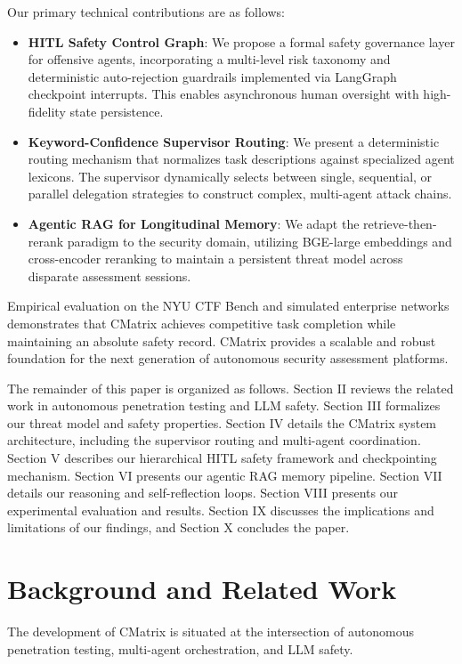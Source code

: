 \documentclass[conference,compsoc]{IEEEtran}
\begin{document}
Our primary technical contributions are as follows:
\begin{itemize}
    \item \textbf{HITL Safety Control Graph}: We propose a formal safety governance layer for offensive agents, incorporating a multi-level risk taxonomy and deterministic auto-rejection guardrails implemented via LangGraph checkpoint interrupts. This enables asynchronous human oversight with high-fidelity state persistence.
    
    \item \textbf{Keyword-Confidence Supervisor Routing}: We present a deterministic routing mechanism that normalizes task descriptions against specialized agent lexicons. The supervisor dynamically selects between single, sequential, or parallel delegation strategies to construct complex, multi-agent attack chains.

    \item \textbf{Agentic RAG for Longitudinal Memory}: We adapt the retrieve-then-rerank paradigm to the security domain, utilizing BGE-large embeddings and cross-encoder reranking to maintain a persistent threat model across disparate assessment sessions.
\end{itemize}

Empirical evaluation on the NYU CTF Bench and simulated enterprise networks demonstrates that CMatrix achieves competitive task completion while maintaining an absolute safety record. CMatrix provides a scalable and robust foundation for the next generation of autonomous security assessment platforms.

The remainder of this paper is organized as follows. Section II reviews the related work in autonomous penetration testing and LLM safety. Section III formalizes our threat model and safety properties. Section IV details the CMatrix system architecture, including the supervisor routing and multi-agent coordination. Section V describes our hierarchical HITL safety framework and checkpointing mechanism. Section VI presents our agentic RAG memory pipeline. Section VII details our reasoning and self-reflection loops. Section VIII presents our experimental evaluation and results. Section IX discusses the implications and limitations of our findings, and Section X concludes the paper.

\section{Background and Related Work}
The development of CMatrix is situated at the intersection of autonomous penetration testing, multi-agent orchestration, and LLM safety.
\end{document}
